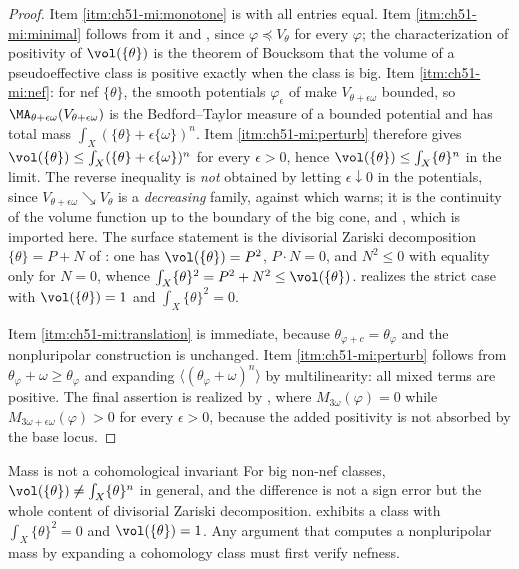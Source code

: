 \begin{proof}
Item \cref{itm:ch51-mi:monotone} is
 with all entries equal.  Item
\cref{itm:ch51-mi:minimal} follows from it and
, since \(\varphi\preceq V_\theta\)
for every \(\varphi\); the characterization of positivity of
\(\vol(\{\theta\})\) is the theorem of Boucksom
\cite{Bou02,Bou02b} that the volume of a pseudoeffective class is
positive exactly when the class is big.  Item \cref{itm:ch51-mi:nef}: for
nef \(\{\theta\}\), the smooth potentials \(\varphi_\epsilon\) of
 make \(V_{\theta+\epsilon\omega}\) bounded, so
\(\MA_{\theta+\epsilon\omega}(V_{\theta+\epsilon\omega})\) is the
Bedford--Taylor measure of a bounded potential and has total mass
\(\int_X(\{\theta\}+\epsilon\{\omega\})^n\).  Item
\cref{itm:ch51-mi:perturb} therefore gives
\(\vol(\{\theta\})\leq\int_X(\{\theta\}+\epsilon\{\omega\})^n\) for every
\(\epsilon>0\), hence \(\vol(\{\theta\})\leq\int_X\{\theta\}^n\) in the
limit.  The reverse inequality is \emph{not} obtained by letting
\(\epsilon\downarrow0\) in the potentials, since
\(V_{\theta+\epsilon\omega}\searrow V_\theta\) is a \emph{decreasing}
family, against which  warns; it is the
continuity of the volume function up to the boundary of the big cone,
\cite[Theorem~1.16]{BEGZ10} and \cite{Bou02}, which is imported here.  The surface statement is the
divisorial Zariski decomposition \(\{\theta\}=P+N\) of \cite{Bou04}: one
has \(\vol(\{\theta\})=P^2\), \(P\cdot N=0\), and \(N^2\leq0\) with
equality only for \(N=0\), whence
\(\int_X\{\theta\}^2=P^2+N^2\leq\vol(\{\theta\})\).
 realizes the strict case with
\(\vol(\{\theta\})=1\) and \(\int_X\{\theta\}^2=0\).

Item \cref{itm:ch51-mi:translation} is immediate, because
\(\theta_{\varphi+c}=\theta_\varphi\) and the nonpluripolar construction
is unchanged.  Item \cref{itm:ch51-mi:perturb} follows from
\(\theta_\varphi+\omega\geq\theta_\varphi\) and expanding
\(\langle(\theta_\varphi+\omega)^n\rangle\) by multilinearity: all mixed
terms are positive.  The final assertion is realized by
, where \(M_{3\omega}(\varphi)=0\) while
\(M_{3\omega+\epsilon\omega}(\varphi)>0\) for every \(\epsilon>0\),
because the added positivity is not absorbed by the base locus.
\end{proof}

\begin{warning}{Mass is not a cohomological invariant}
\label{warn:ch51-mass-not-cohomological}
For big non-nef classes, \(\vol(\{\theta\})\neq\int_X\{\theta\}^n\) in
general, and the difference is not a sign error but the whole content of
divisorial Zariski decomposition.   exhibits a
class with \(\int_X\{\theta\}^2=0\) and \(\vol(\{\theta\})=1\).  Any
argument that computes a nonpluripolar mass by expanding a cohomology
class must first verify nefness.
\end{warning}

